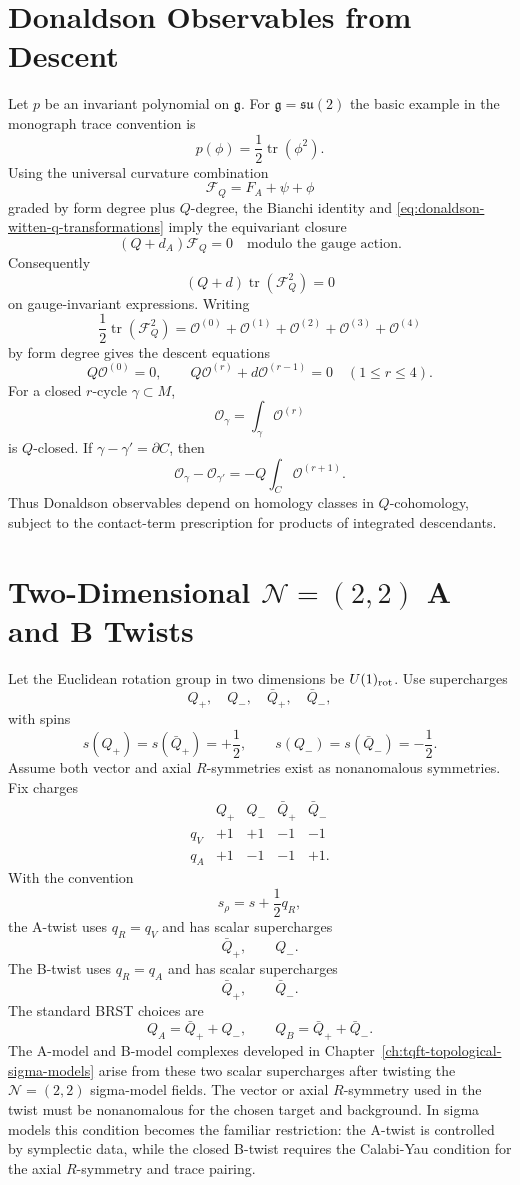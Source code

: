 \section{Donaldson Observables from Descent}

Let \(p\) be an invariant polynomial on \(\mathfrak g\).  For
\(\mathfrak g=\mathfrak{su}(2)\) the basic example in the monograph trace
convention is
\[
  p(\phi)=\frac12\operatorname{tr}(\phi^2).
\]
Using the universal curvature combination
\[
  \mathcal F_Q
  =
  F_A+\psi+\phi
\]
graded by form degree plus \(Q\)-degree, the Bianchi identity and
\eqref{eq:donaldson-witten-q-transformations} imply the equivariant closure
\[
  (Q+d_A)\mathcal F_Q=0
  \quad\text{modulo the gauge action}.
\]
Consequently
\[
  (Q+d)\operatorname{tr}(\mathcal F_Q^2)=0
\]
on gauge-invariant expressions.  Writing
\[
  \frac12\operatorname{tr}(\mathcal F_Q^2)
  =
  \mathcal O^{(0)}+\mathcal O^{(1)}+\mathcal O^{(2)}
  +\mathcal O^{(3)}+\mathcal O^{(4)}
\]
by form degree gives the descent equations
\[
  Q\mathcal O^{(0)}=0,
  \qquad
  Q\mathcal O^{(r)}+d\mathcal O^{(r-1)}=0
  \quad(1\le r\le4).
\]
For a closed \(r\)-cycle \(\gamma\subset M\),
\[
  \mathcal O_\gamma=\int_\gamma\mathcal O^{(r)}
\]
is \(Q\)-closed.  If \(\gamma-\gamma'=\partial C\), then
\[
  \mathcal O_\gamma-\mathcal O_{\gamma'}
  =
  -Q\int_C\mathcal O^{(r+1)}.
\]
Thus Donaldson observables depend on homology classes in \(Q\)-cohomology,
subject to the contact-term prescription for products of integrated
descendants.

\section{\texorpdfstring{Two-Dimensional \(\mathcal N=(2,2)\) A and B Twists}{Two-Dimensional N=(2,2) A and B Twists}}

Let the Euclidean rotation group in two dimensions be \(U(1)_{\rm rot}\).
Use supercharges
\[
  Q_+,\quad Q_-,\quad \bar Q_+,\quad \bar Q_- ,
\]
with spins
\[
  s(Q_+)=s(\bar Q_+)=+\frac12,
  \qquad
  s(Q_-)=s(\bar Q_-)=-\frac12 .
\]
Assume both vector and axial \(R\)-symmetries exist as nonanomalous
symmetries.  Fix charges
\[
\begin{array}{c|rrrr}
 & Q_+ & Q_- & \bar Q_+ & \bar Q_-\\ \hline
q_V & +1 & +1 & -1 & -1\\
q_A & +1 & -1 & -1 & +1 .
\end{array}
\]
With the convention
\[
  s_\rho=s+\frac12 q_R ,
\]
the A-twist uses \(q_R=q_V\) and has scalar supercharges
\[
  \bar Q_+,\qquad Q_- .
\]
The B-twist uses \(q_R=q_A\) and has scalar supercharges
\[
  \bar Q_+,\qquad \bar Q_- .
\]
The standard BRST choices are
\[
  Q_A=\bar Q_+ + Q_-,
  \qquad
  Q_B=\bar Q_+ + \bar Q_- .
\]
The A-model and B-model complexes developed in
Chapter~\ref{ch:tqft-topological-sigma-models} arise from these two scalar
supercharges after twisting the \(\mathcal N=(2,2)\) sigma-model fields.
The vector or axial \(R\)-symmetry used in the twist must be nonanomalous for
the chosen target and background.  In sigma models this condition becomes
the familiar restriction: the A-twist is controlled by symplectic data, while
the closed B-twist requires the Calabi-Yau condition for the axial
\(R\)-symmetry and trace pairing.

